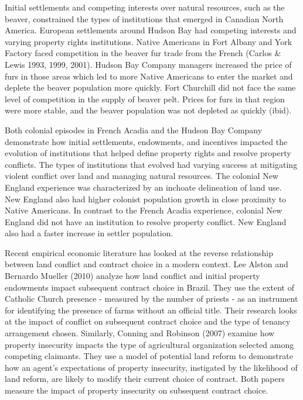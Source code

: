 \documentclass[11pt, oneside]{article}
\begin{document}
Initial settlements and competing interests over natural resources, such as the beaver, constrained the types of institutions that emerged in Canadian North America. European settlements around Hudson Bay had competing interests and varying property rights institutions. Native Americans in Fort Albany and York Factory faced competition in the beaver fur trade from the French (Carlos \& Lewis 1993, 1999, 2001). Hudson Bay Company managers increased the price of furs in those areas which led to more Native Americans to enter the market and deplete the beaver population more quickly. Fort Churchill did not face the same level of competition in the supply of beaver pelt. Prices for furs in that region were more stable, and the beaver population was not depleted as quickly (ibid).

Both colonial episodes in French Acadia and the Hudson Bay Company demonstrate how initial settlements, endowments, and incentives impacted the evolution of institutions that helped define property rights and resolve property conflicts. The types of institutions that evolved had varying success at mitigating violent conflict over land and managing natural resources. The colonial New England experience was characterized by an inchoate delineation of land use. New England also had higher colonist population growth in close proximity to Native Americans. In contrast to the French Acadia experience, colonial New England did not have an institution to resolve property conflict. New England also had a faster increase in settler population.

Recent empirical economic literature has looked at the reverse relationship between land conflict and contract choice in a modern context. %
Lee Alston and Bernardo Mueller (2010) analyze how land conflict and initial property endowments impact subsequent contract choice in Brazil. They use the extent of Catholic Church presence - measured by the number of priests - as an instrument for identifying the presence of farms without an official title. Their research looks at the impact of conflict on subsequent contract choice and the type of tenancy arrangement chosen. Similarly, Conning and Robinson (2007) examine how property insecurity impacts the type of agricultural organization selected among competing claimants. They use a model of potential land reform to demonstrate how an agent's expectations of property insecurity, instigated by the likelihood of land reform, are likely to modify their current choice of contract. Both papers measure the impact of property insecurity on subsequent contract choice.
\end{document}
